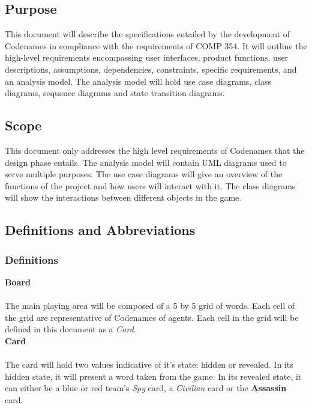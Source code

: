 \documentclass[10pt, a4paper]{article}
\begin{document}
	\subsection{Purpose}
	
	This document will describe the specifications entailed by the development of Codenames in compliance with the requirements of COMP 354. It will outline the high-level requirements encompassing user interfaces, product functions, user descriptions, assumptions, dependencies, constraints, specific requirements, and an analysis model. The analysis model will hold use case diagrams, class diagrams, sequence diagrams and state transition diagrams.
	
	\subsection{Scope}
	
	This document only addresses the high level requirements of Codenames that the design phase entails. The analysis model will contain UML diagrams used to serve multiple purposes. The use case diagrams will give an overview of the functions of the project and how users will interact with it. The class diagrams will show the interactions between different objects in the game. \\
	

	\subsection{Definitions and Abbreviations}
	
		\subsubsection{Definitions}
	
		\textbf{Board} \\
		\\
		The main playing area will be composed of a 5 by 5 grid of words. Each cell of the grid are representative of Codenames of agents. Each cell in the grid will be defined in this document as a \textit{Card}.\\
	
		\textbf{Card} \\
		\\
		The card will hold two values indicative of it's state: hidden or revealed. In its hidden state, it will present a word taken from the game. In its revealed state, it can either be a blue or red team's \textit{Spy} card, a \textit{Civilian} card or the \textbf{Assassin} card.\\
		
\end{document}

